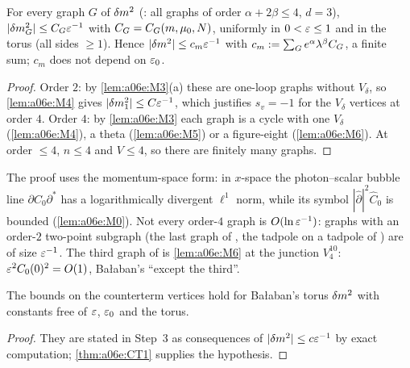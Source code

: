 \begin{theorem}\label{thm:a06e:CT1}
For every graph $G$ of $\delta m^2$ (\cite[(1.22)--(1.23)]{Ba3}: all graphs of order $\alpha+2\beta\le4$, $d=3$), $|\delta m^2_G|\le C_G\varepsilon^{-1}$ with $C_G=C_G(m,\mu_0,N)$, uniformly in $0<\varepsilon\le1$ and in the torus (all sides $\ge1$). Hence $|\delta m^2|\le c_m\varepsilon^{-1}$ with $c_m:=\sum_Ge^\alpha\lambda^\beta C_G$, a finite sum; $c_m$ does not depend on $\varepsilon_0$.
\end{theorem}

\begin{proof}
Order $2$: by \cref{lem:a06e:M3}(a) these are one-loop graphs without $V_\delta$, so \cref{lem:a06e:M4} gives $|\delta m^2_1|\le C\varepsilon^{-1}$, which justifies $s_v=-1$ for the $V_\delta$ vertices at order $4$. Order $4$: by \cref{lem:a06e:M3} each graph is a cycle with one $V_\delta$ (\cref{lem:a06e:M4}), a theta (\cref{lem:a06e:M5}) or a figure-eight (\cref{lem:a06e:M6}). At order $\le4$, $n\le4$ and $V\le4$, so there are finitely many graphs.
\end{proof}

The proof uses the momentum-space form: in $x$-space the photon--scalar bubble line $\partial C_0\partial^*$ has a logarithmically divergent $\ell^1$ norm, while its symbol $|\hat\partial|^2\hat C_0$ is bounded (\cref{lem:a06e:M0}). Not every order-$4$ graph is $O(\ln\varepsilon^{-1})$: graphs with an order-$2$ two-point subgraph (the last graph of \cite[(1.22)]{Ba3}, the tadpole on a tadpole of \cite[(1.23)]{Ba3}) are of size $\varepsilon^{-1}$. The third graph of \cite[(1.22)]{Ba3} is \cref{lem:a06e:M6} at the junction $V^{10}_4$: $\varepsilon^2C_0(0)^2=O(1)$, Ba{\l}aban's ``except the third''.

\begin{corollary}[{\cite[(2.11)--(2.13)]{Ba2}}]\label{cor:a06e:C1}
The bounds \cite[(2.11)--(2.13)]{Ba2} on the counterterm vertices hold for Ba{\l}aban's torus $\delta m^2$ with constants free of $\varepsilon$, $\varepsilon_0$ and the torus.
\end{corollary}

\begin{proof}
They are stated in Step~3 as consequences of $|\delta m^2|\le c\varepsilon^{-1}$ by exact computation; \cref{thm:a06e:CT1} supplies the hypothesis.
\end{proof}

